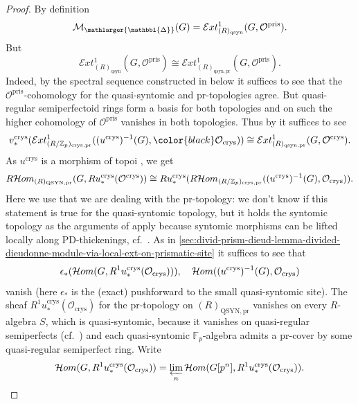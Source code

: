 \documentclass{amsart}
\newcommand{\prism}{{\mathlarger{\mathbbl{\Delta}}}}
\theoremstyle{plain}
\theoremstyle{definition}
\newcommand{\crys}{\mathrm{crys}}
\newcommand{\pris}{\mathrm{pris}}
\newcommand{\Z}{\mathbb{Z}}
\newcommand{\red}[1]{{\color{black} #1}}
\newcommand{\blue}[1]{{\color{black}#1}}
\begin{document}
\begin{proof}
  By definition
  $$
  \mathcal{M}_{\prism}(G)=\mathcal{E}xt^{1}_{(R)_{\mathrm{qsyn}}}(G,\mathcal{O}^\pris).
  $$
  But
  $$
  \mathcal{E}xt^{1}_{(R)_{\mathrm{qsyn}}}(G,\mathcal{O}^\pris)\cong \mathcal{E}xt^{1}_{(R)_{\mathrm{qsyn,pr}}}(G,\mathcal{O}^\pris).
  $$
  Indeed, by \blue{the spectral sequence constructed in \Cref{sec:calc-ext-groups} below} it suffices to see that the $\mathcal{O}^{\pris}$-cohomology for the quasi-syntomic and pr-topologies agree. But quasi-regular semiperfectoid rings form a basis for both topologies and on such the higher cohomology of $\mathcal{O}^\pris$ vanishes in both topologies.
  Thus by  it suffices to see
  $$
  v_\ast^{\rm crys}(\mathcal{E}xt^{1}_{(R/\Z_p)_{\crys,\mathrm{pr}}}((u^{\rm crys})^{-1}(G),\red{\mathcal{O}_{\crys}}))\cong \mathcal{E}xt^1_{(R)_{\mathrm{qsyn,pr}}}(G,\mathcal{O}^\crys).
  $$
  \red{ 
  As $u^\crys$ is a morphism of topoi , we get
  \[
    R\mathcal{H}om_{(R)_{\mathrm{QSYN,pr}}}(G,Ru_\ast^{\crys}(\mathcal{O}^\crys))\cong Ru_\ast^\crys(R\mathcal{H}om_{(R/\Z_p)_{\rm crys,pr}}((u^{\crys})^{-1}(G),\mathcal{O}_\crys)).
  \]
  Here we use that we are dealing with the pr-topology: we don't know if this statement is true for the quasi-syntomic topology, but it holds the syntomic topology as the arguments of \cite[Proposition 1.1.5]{berthelot_breen_messing_theorie_de_dieudonne_cristalline_II} apply because syntomic morphisms can be lifted locally along PD-thickenings, cf.\ \cite[Tag 0070]{stacks_project}. 
  As in \ref{sec:divid-prism-dieud-lemma-divided-dieudonne-module-via-local-ext-on-prismatic-site} it suffices to see that
    \[
      \epsilon_\ast(\mathcal{H}om(G,R^1u^{\mathrm{crys}}_{\ast}(\mathcal{O}_{\mathrm{crys}}))),\quad \mathcal{H}om((u^{\rm crys})^{-1}(G),\mathcal{O}_{\rm crys})
    \]
    vanish (here $\epsilon_\ast$ is the (exact) pushforward to the small quasi-syntomic site). The sheaf $R^1u^\crys_\ast(\mathcal{O}_\crys)$ for the pr-topology on $(R)_{\mathrm{ QSYN,pr}}$ vanishes on every $R$-algebra $S$, which is quasi-syntomic, because it vanishes on quasi-regular semiperfects (cf.\ \cite[Section 8]{bhatt_morrow_scholze_topological_hochschild_homology}) and each quasi-syntomic $\mathbb{F}_p$-algebra admits a pr-cover by some quasi-regular semiperfect ring. Write
    \[
      \mathcal{H}om(G,R^1u^{\mathrm{crys}}_{\ast}(\mathcal{O}_{\mathrm{crys}}))=\varprojlim\limits_{n}\mathcal{H}om(G[p^n],R^1u^{\mathrm{crys}}_\ast(\mathcal{O}_\crys)).
    \]
}
\end{proof}
\end{document}
